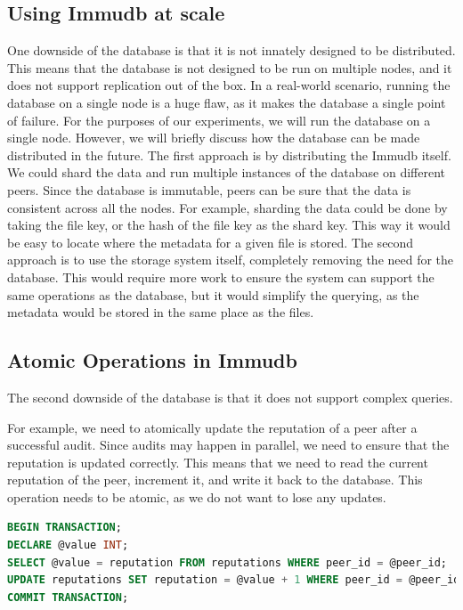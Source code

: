 \subsection{Using Immudb at scale}

One downside of the database is that it is not innately designed to be distributed.
This means that the database is not designed to be run on multiple nodes,
and it does not support replication out of the box.
In a real-world scenario, running the database on a single node is a huge flaw,
as it makes the database a single point of failure.
For the purposes of our experiments, we will run the database on a single node.
However, we will briefly discuss how the database can be made distributed in the future.
The first approach is by distributing the Immudb itself.
We could shard the data and run multiple instances of the database on different peers.
Since the database is immutable, peers can be sure that the data is consistent across all the nodes.
For example, sharding the data could be done by taking the file key, or the hash of the file key as the shard key.
This way it would be easy to locate where the metadata for a given file is stored.
The second approach is to use the storage system itself, completely removing the need for the database.
This would require more work to ensure the system can support the same operations as the database,
but it would simplify the querying, as the metadata would be stored in the same place as the files.

\subsection{Atomic Operations in Immudb}
\label{section:atomic-operations}

The second downside of the database is that it does not support complex queries.

For example, we need to atomically update the reputation of a peer after a successful audit.
Since audits may happen in parallel, we need to ensure that the reputation is updated correctly.
This means that we need to read the current reputation of the peer, increment it, and write it back to the database.
This operation needs to be atomic, as we do not want to lose any updates.

\begin{lstlisting}[language=SQL, caption={SQL query to update the reputation of a peer}, label={lst:sql-query}]
BEGIN TRANSACTION;
DECLARE @value INT;
SELECT @value = reputation FROM reputations WHERE peer_id = @peer_id;
UPDATE reputations SET reputation = @value + 1 WHERE peer_id = @peer_id;
COMMIT TRANSACTION;
\end{lstlisting}

